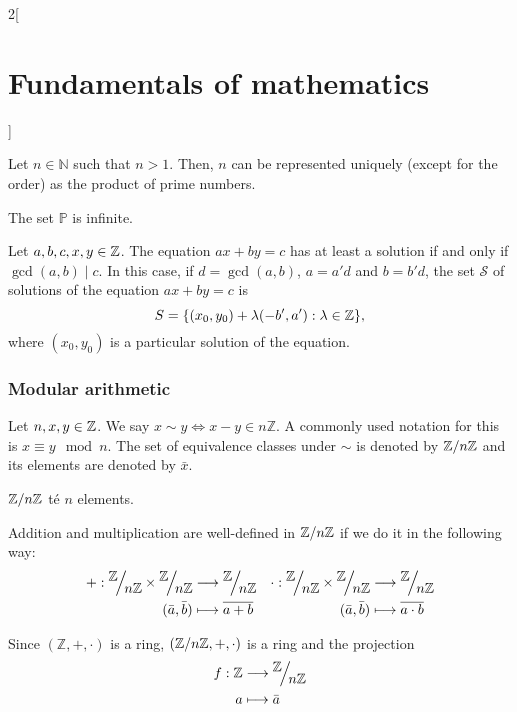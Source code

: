 \documentclass[../../../main.tex]{subfiles}
\begin{document}
\begin{multicols}{2}[\section{Fundamentals of mathematics}]
\begin{theorem}
        Let $n\in\mathbb{N}$ such that $n>1$. Then, $n$ can be represented uniquely (except for the order) as the product of prime numbers.
    \end{theorem}
    \begin{theorem}
        The set $\mathbb{P}$ is infinite. 
    \end{theorem}
    \begin{theorem}
        Let $a,b,c,x,y\in\mathbb{Z}$. The equation $ax+by=c$ has at least a solution if and only if $\gcd(a,b)\mid c$. In this case, if $d=\gcd(a,b)$, $a=a'd$ and $b=b'd$, the set $\mathcal{S}$ of solutions of the equation $ax+by=c$ is $$S=\{(x_0,y_0)+\lambda(-b',a'):\lambda\in\mathbb{Z}\},$$ where $(x_0,y_0)$ is a particular solution of the equation. 
    \end{theorem}
    \subsubsection*{Modular arithmetic}
    \begin{definition}
        Let $n,x,y\in\mathbb{Z}$. We say $x\sim y\iff x-y\in n\mathbb{Z}$. A commonly used notation for this is $x\equiv y\mod n$. The set of equivalence classes under $\sim$ is denoted by $\quot{\mathbb{Z}}{n\mathbb{Z}}$ and its elements are denoted by $\bar{x}$.
    \end{definition}
    \begin{lemma}
        $\quot{\ZZ}{n\ZZ}$ té $n$ elements.
    \end{lemma}
    \begin{prop}
        Addition and multiplication are well-defined in $\quot{\ZZ}{n\ZZ}$ if we do it in the following way:
        \begin{align*}
            +:\quot{\ZZ}{n\ZZ}\times\quot{\ZZ}{n\ZZ}&\longrightarrow\quot{\ZZ}{n\ZZ}&\cdot:\quot{\ZZ}{n\ZZ}\times\quot{\ZZ}{n\ZZ}&\longrightarrow\quot{\ZZ}{n\ZZ}\\
            (\bar{a},\bar{b})&\longmapsto\overline{a+b}&(\bar{a},\bar{b})&\longmapsto\overline{a\cdot b}
        \end{align*}
    \end{prop}
    \begin{theorem}
        Since $(\mathbb{Z},+,\cdot)$ is a ring, $(\quot{\ZZ}{n\ZZ},+,\cdot)$ is a ring and the projection 
        \begin{align*}
            f:\mathbb{Z}&\longrightarrow\quot{\ZZ}{n\ZZ}\\
            a&\longmapsto\bar{a}
        \end{align*}

\end{theorem}
\end{multicols}
\end{document}
